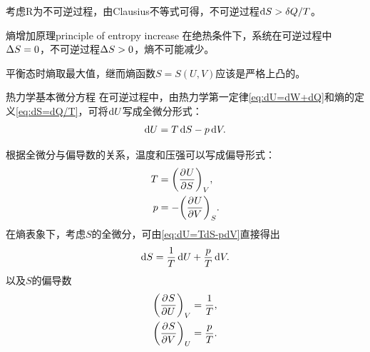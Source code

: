\begin{corollary}
	考虑R为不可逆过程，由Clausius不等式可得，不可逆过程$\d S>\vd Q/T$。
\end{corollary}

\begin{theorem}
	{熵增加原理}{principle of entropy increase}
	在绝热条件下，系统在可逆过程中$\D S=0$，不可逆过程$\D S>0$，熵不可能减少。
\end{theorem}

\begin{corollary}
	平衡态时熵取最大值，继而熵函数$S=S(U,V)$应该是严格上凸的。
\end{corollary}




\begin{theorem}
	{热力学基本微分方程}{}
	在可逆过程中，由热力学第一定律\eqref{eq:dU=dW+dQ}和熵的定义\eqref{eq:dS=dQ/T}，可将$\d U$写成全微分形式：
	\begin{equation}
		\label{eq:dU=TdS-pdV}
		\d U=T\d S-p\d V.
	\end{equation}
\end{theorem}

\begin{corollary}
	根据全微分与偏导数的关系，温度和压强可以写成偏导形式：
	\begin{subequations}
		\begin{align}
			T&=\pu[V]US,\\
			p&=-\pu[S]UV.
		\end{align}
	\end{subequations}
	在熵表象下，考虑$S$的全微分，可由\eqref{eq:dU=TdS-pdV}直接得出
	\begin{equation}
		\d S=\frac1T\d U+\frac pT\d V.
	\end{equation}
	以及$S$的偏导数
	\begin{subequations}
		\begin{align}
			\pu[V]SU&=\frac1T,\\
			\pu[U]SV&=\frac pT.
		\end{align}
	\end{subequations}
\end{corollary}

